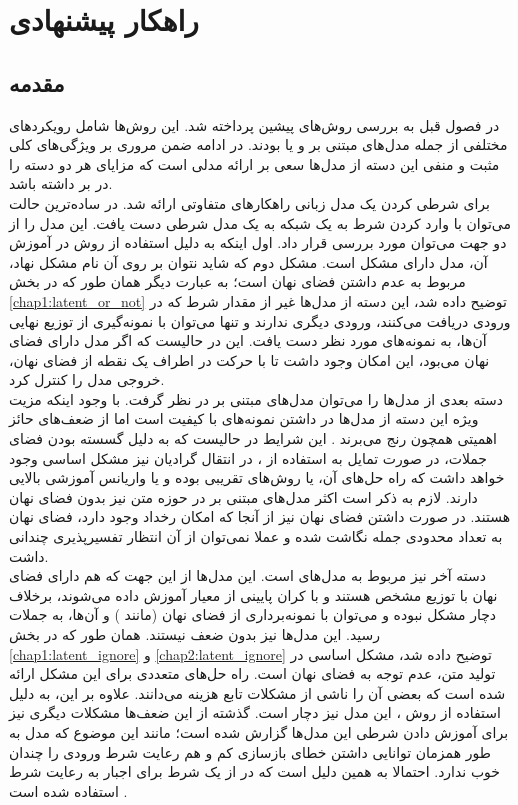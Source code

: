 \chapter{راهکار پیشنهادی}\label{chap3}
\minitoc

\section{مقدمه}
در فصول قبل به بررسی روش‌های پیشین پرداخته شد. این روش‌ها شامل رویکرد‌های مختلفی از جمله مدل‌های مبتنی بر \gan{} و یا \vae{} بودند. در ادامه ضمن مروری بر ویژگی‌های کلی مثبت و منفی این دسته از مدل‌ها سعی بر ارائه مدلی است که مزایای هر دو دسته را در بر داشته باشد.
\\
برای شرطی کردن یک مدل زبانی راهکارهای متفاوتی ارائه شد. در ساده‌ترین حالت می‌توان با وارد کردن شرط به یک شبکه  به یک مدل شرطی دست یافت. این مدل را از دو جهت می‌توان مورد بررسی قرار داد. اول اینکه به دلیل استفاده از روش \teacherforcing{} در آموزش آن، مدل دارای مشکل \expbias{} است. مشکل دوم که شاید نتوان بر روی آن نام مشکل نهاد، مربوط به عدم داشتن فضای نهان است؛ به عبارت دیگر همان طور که در بخش  \ref{chap1:latent_or_not} توضیح داده شد، این دسته از مدل‌ها غیر از مقدار شرط که در ورودی دریافت می‌کنند، ورودی دیگری ندارند و تنها می‌توان با نمونه‌گیری از توزیع نهایی آن‌ها، به نمونه‌های مورد نظر دست یافت. این در حالیست که اگر مدل دارای فضای نهان می‌بود، این امکان وجود داشت تا با حرکت در اطراف یک نقطه از فضای نهان، خروجی مدل را کنترل کرد.
\\
دسته بعدی از مدل‌ها را می‌توان مدل‌های مبتنی بر \gan{} در نظر گرفت. با وجود اینکه مزیت ویژه این دسته از مدل‌ها در داشتن  نمونه‌های با کیفیت است اما از ضعف‌های حائز اهمیتی همچون \modecollapse{} رنج می‌برند \cite{wgan}. این شرایط در حالیست که به دلیل گسسته بودن فضای جملات، در صورت تمایل به استفاده از \gan{}، در انتقال گرادیان نیز مشکل اساسی وجود خواهد داشت که راه حل‌های آن، یا روش‌های تقریبی بوده و یا واریانس آموزشی بالایی دارند. لازم به ذکر است اکثر مدل‌های مبتنی بر \gan{} در حوزه متن نیز بدون فضای نهان هستند. در صورت داشتن فضای نهان نیز از آنجا که امکان رخداد \modecollapse{} وجود دارد، فضای نهان به تعداد محدودی جمله نگاشت شده و عملا نمی‌توان از آن انتظار تفسیرپذیری چندانی داشت.
\\
دسته آخر نیز مربوط به مدل‌های \vae{} است. این مدل‌ها از این جهت که هم دارای فضای نهان با توزیع مشخص هستند و با کران پایینی از معیار \likelihood{} آموزش داده می‌شوند، برخلاف \gan{} دچار مشکل \modecollapse{} نبوده و می‌توان با نمونه‌برداری از فضای نهان (مانند \gan{}) و \decode{} آن‌ها، به جملات رسید. این مدل‌ها نیز بدون ضعف نیستند. همان طور که در بخش \ref{chap1:latent_ignore} و \ref{chap2:latent_ignore} توضیح داده شد، مشکل اساسی \vae{} در تولید متن، عدم توجه به فضای نهان است. راه حل‌های متعددی برای این مشکل ارائه شده است که بعضی آن را ناشی از مشکلات تابع هزینه می‌دانند. علاوه بر این، به دلیل استفاده از روش ‌\teacherforcing{}، این مدل نیز دچار \expbias{} است. گذشته از این ضعف‌ها مشکلات دیگری نیز برای آموزش دادن شرطی این مدل‌ها گزارش شده است؛ مانند این موضوع که مدل به طور همزمان توانایی داشتن خطای بازسازی کم و هم رعایت شرط ورودی را چندان خوب ندارد. احتمالا به همین دلیل است که در \towardctg{} از یک \classifier{} شرط برای اجبار \decoder{} به رعایت شرط استفاده شده است \cite{toward}.


